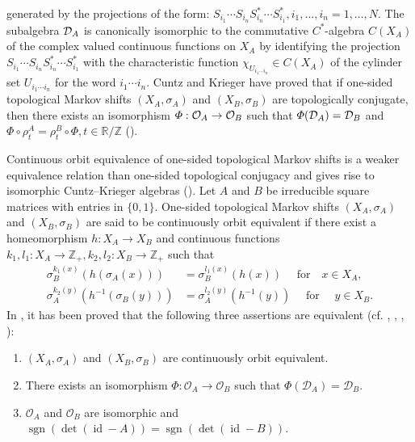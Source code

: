 \documentclass[11pt]{article}
\theoremstyle{plain}
\theoremstyle{definition}
\numberwithin{equation}{section}
\renewcommand{\labelenumi}{\textup{(\theenumi)}}
\newcommand{\BF}{\operatorname{BF}}
\newcommand{\id}{\operatorname{id}}
\newcommand{\sgn}{\operatorname{sgn}}
\def\det{{{\operatorname{det}}}}
\newcommand{\RZ}{\mathbb{R}/{\mathbb{Z}}}
\newcommand{\Zp}{{\mathbb{Z}}_+}
\begin{document}
generated by the projections of the form:
$S_{i_1}\cdots S_{i_n}S_{i_n}^* \cdots S_{i_1}^*,
i_1,\dots,i_n =1,\dots,N$.
The subalgebra ${{\mathcal{D}}_A}$ is canonically isomorphic to the commutative 
$C^*$-algebra $C(X_A)$
of the complex valued continuous functions on $X_A$
by identifying the projection
$S_{i_1}\cdots S_{i_n}S_{i_n}^* \cdots S_{i_1}^*
$
with the characteristic function
$\chi_{U_{i_1\cdots i_n}} \in C(X_A)$
of the cylinder set
$U_{i_1\cdots i_n}$
for the word
${i_1\cdots i_n}$.
Cuntz and Krieger have proved that if one-sided topological Markov shifts $(X_A,\sigma_A)$ and   
$(X_B,\sigma_B)$ are topologically conjugate,
then there exists an isomorphism 
$\varPhi: {{\mathcal{O}}_A}\rightarrow {{\mathcal{O}}_B}$
such that
$\varPhi({{\mathcal{D}}_A}) = {{\mathcal{D}}_B}$
and
$\varPhi\circ \rho^A_t = \rho^B_t \circ \varPhi, t \in \RZ$
(\cite[2.17 Proposition]{CK}). 




Continuous orbit equivalence of one-sided topological Markov shifts
is a weaker equivalence relation than one-sided topological conjugacy
 and
 gives rise to isomorphic Cuntz--Krieger algebras (\cite{MaPacific}).
Let $A$ and $B$ be irreducible square matrices with entries in $\{0,1 \}$.
One-sided topological Markov shifts
$(X_A, \sigma_A)$ and $(X_B,\sigma_B)$ 
are said to be continuously orbit equivalent 
if there exist a homeomorphism
$h: X_A \rightarrow X_B$ 
and continuous functions 
$k_1,l_1: X_A\rightarrow \Zp,
 k_2,l_2: X_B\rightarrow \Zp 
$
such that
\begin{align}
\sigma_B^{k_1(x)} (h(\sigma_A(x))) 
& = \sigma_B^{l_1(x)}(h(x))
\quad 
\text{ for} \quad 
x \in X_A,  \label{eq:orbiteq1x} \\
\sigma_A^{k_2(y)} (h^{-1}(\sigma_B(y))) 
& = \sigma_A^{l_2(y)}(h^{-1}(y))
\quad 
\text{ for } \quad 
y \in X_B. \label{eq:orbiteq2y}
\end{align}
In \cite{MMKyoto}, it has been proved that 
the following three assertions are equivalent
(cf. \cite{MaPacific}, \cite{MaPAMS}, 
\cite{MatuiPLMS}, \cite{MatuiPre2012}):
\begin{enumerate}
\renewcommand{\theenumi}{\roman{enumi}}
\renewcommand{\labelenumi}{\textup{(\theenumi)}}
\item
 $(X_A, \sigma_A)$ and $(X_B,\sigma_B)$ 
are continuously orbit equivalent.
\item There exists an isomorphism $\Phi:\mathcal{O}_A\to\mathcal{O}_B$ 
such that $\Phi(\mathcal{D}_A)=\mathcal{D}_B$. 
\item $\mathcal{O}_A$ and $\mathcal{O}_B$ 
are isomorphic and $\sgn(\det(\id-A))= \sgn(\det(\id-B))$. 
\end{enumerate}
\end{document}
